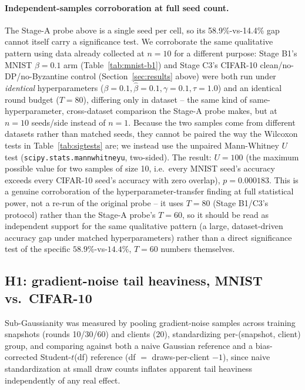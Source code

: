 \documentclass{article}
\begin{document}
\paragraph{Independent-samples corroboration at full seed count.} The Stage-A probe
above is a single seed per cell, so its 58.9\%-vs-14.4\% gap cannot itself carry a
significance test. We corroborate the same qualitative pattern using data already
collected at $n{=}10$ for a different purpose: Stage B1's MNIST $\beta{=}0.1$ arm
(Table~\ref{tab:mnist-b1}) and Stage C3's CIFAR-10 clean/no-DP/no-Byzantine control
(Section~\ref{sec:results} above) were both run under \emph{identical} hyperparameters
($\beta{=}0.1,\hat\beta{=}0.1,\gamma{=}0.1,\tau{=}1.0$) and an identical round budget
($T{=}80$), differing only in dataset -- the same kind of same-hyperparameter,
cross-dataset comparison the Stage-A probe makes, but at $n{=}10$ seeds/side instead of
$n{=}1$. Because the two samples come from different datasets rather than matched
seeds, they cannot be paired the way the Wilcoxon tests in
Table~\ref{tab:sigtests} are; we instead use the unpaired
Mann-Whitney $U$ test (\texttt{scipy.stats.mannwhitneyu}, two-sided). The result:
$U{=}100$ (the maximum possible value for two samples of size 10, i.e.\ every MNIST
seed's accuracy exceeds every CIFAR-10 seed's accuracy with zero overlap), $p{=}0.000183$.
This is a genuine corroboration of the hyperparameter-transfer finding at full
statistical power, not a re-run of the original probe -- it uses $T{=}80$ (Stage
B1/C3's protocol) rather than the Stage-A probe's $T{=}60$, so it should be read as
independent support for the same qualitative pattern (a large, dataset-driven
accuracy gap under matched hyperparameters) rather than a direct significance test
of the specific $58.9\%$-vs-$14.4\%$, $T{=}60$ numbers themselves.

\subsection{H1: gradient-noise tail heaviness, MNIST vs.\ CIFAR-10}
Sub-Gaussianity was measured by pooling gradient-noise samples across training
snapshots (rounds 10/30/60) and clients (20), standardizing per-(snapshot,
client) group, and comparing against both a naive Gaussian reference and a
bias-corrected Student-$t$(df) reference (df $=$ draws-per-client $-1$), since
naive standardization at small draw counts inflates apparent tail heaviness
independently of any real effect.
\end{document}
